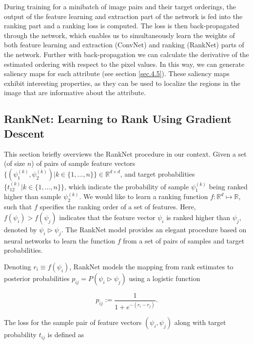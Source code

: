 During training for a minibatch of image pairs and their target orderings, the output of the feature learning and extraction part of the network is fed into the ranking part and a ranking loss is computed. The loss is then back-propagated through the network, which enables us to simultaneously learn the weights of both feature learning and extraction (ConvNet) and ranking (RankNet) parts of the network.  
Further with back-propagation we can calculate the derivative of the estimated ordering with respect to the pixel values.
In this way, we can generate saliency maps for each attribute (see section \ref{sec.4.5}). These saliency maps exhibit interesting properties, as they can be used to localize the regions in the image that are informative about the attribute.

\subsection{RankNet: Learning to Rank Using Gradient Descent}\label{sec3.1}

This section briefly overviews the RankNet %
procedure in our context.
Given a set (of size $n$) of pairs of sample feature vectors $\big\{( \psi_{1}^{(k)}, \psi_{2}^{(k)} ) | k \in \{1, \dots, n\} \big\} \in \mathbb{R}^{d \times d}$, and target probabilities $\big\{ t_{12}^{(k)} | k \in \{1, \dots, n\} \big\}$, which indicate the probability of  
sample $\psi_{1}^{(k)}$ being ranked higher than sample $\psi_{2}^{(k)}$. 
We would like to learn a ranking function $f : \mathbb{R}^d \mapsto \mathbb{R}$, such that $f$ specifies the ranking order of a set of features. Here, $f(\psi_i) > f(\psi_j)$ indicates that the %
feature vector $\psi_i$ is ranked higher than $\psi_j$, denoted by $\psi_i \triangleright \psi_j$. The RankNet model \cite{Burges2005} provides an elegant procedure based on neural networks 
to learn the function $f$ from a set of pairs of samples and target probabilities.

Denoting $r_i \equiv f(\psi_i)$, RankNet models the mapping from rank estimates to posterior probabilities $p_{ij} = P(\psi_i \triangleright \psi_j)$ using a logistic function 

\begin{equation}
p_{ij} := \frac{1}{1 + e^{-(r_i - r_j)}}.
\label{eq1}
\end{equation}

The loss for the sample pair of feature vectors $(\psi_i, \psi_j)$ along with target probability $t_{ij}$ is defined as

